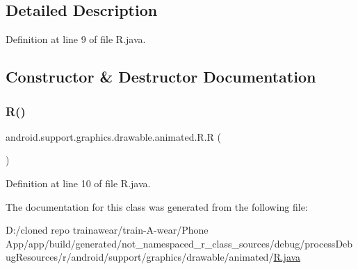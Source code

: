 \subsection{Detailed Description}


Definition at line 9 of file R.\+java.



\subsection{Constructor \& Destructor Documentation}
\mbox{\label{classandroid_1_1support_1_1graphics_1_1drawable_1_1animated_1_1_r_a097d34d9cd60fadc6a4ed075ffdd2f7b}} 
\subsubsection{\texorpdfstring{R()}{R()}}
{\footnotesize\ttfamily android.\+support.\+graphics.\+drawable.\+animated.\+R.\+R (\begin{DoxyParamCaption}{ }\end{DoxyParamCaption})\hspace{0.3cm}{\ttfamily [private]}}



Definition at line 10 of file R.\+java.


\begin{DoxyCode}{0}

\end{DoxyCode}


The documentation for this class was generated from the following file\+:\begin{DoxyCompactItemize}
\item 
D\+:/cloned repo trainawear/train-\/\+A-\/wear/\+Phone App/app/build/generated/not\+\_\+namespaced\+\_\+r\+\_\+class\+\_\+sources/debug/process\+Debug\+Resources/r/android/support/graphics/drawable/animated/\mbox{\hyperlink{process_debug_resources_2r_2android_2support_2graphics_2drawable_2animated_2_r_8java}{R.\+java}}\end{DoxyCompactItemize}
